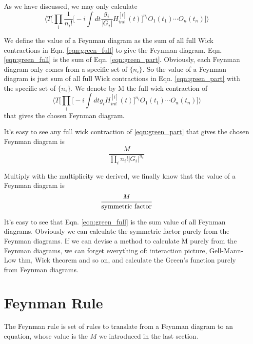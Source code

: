 \documentclass[12pt]{book}
\begin{document}
	As we have discussed, we may only calculate
	\begin{equation}
		\Big \langle T\Big[ \prod_i\frac 1{n_i!}\Big[-i\int dt \frac {g_i}{|G_i|} H_{int}^{[i]}(t)\Big]^{n_i}O_1(t_1)\cdots O_n(t_n)\Big] \Big \rangle \label{eqn:green_part}
	\end{equation} 
	
	We define the value of a Feynman diagram as the sum of all full Wick contractions in Eqn. \ref{eqn:green_full} to give the  Feynman diagram. Eqn. \ref{eqn:green_full} is the sum of Eqn. \ref{eqn:green_part}. Obviously, each Feynman diagram only comes from a specific set of $\{n_i\}$. So the value of a Feynman diagram is just sum of all full Wick contractions in Eqn. \ref{eqn:green_part} with the specific set of $\{n_i\}$. We denote by M the full wick contraction of   
	\begin{equation}
		\Big \langle T\Big[\prod_i\Big[-i\int dt g_iH_{int}^{[i]}(t)\Big]^{n_i}O_1(t_1)\cdots O_n(t_n)\Big] \Big \rangle \label{eqn:green_part}
	\end{equation} 
	that gives the chosen Feynman diagram.
	
	It's easy to see any full wick contraction of \ref{eqn:green_part} that gives the chosen Feynman diagram is
	\begin{equation}
		\frac M{\prod_in_i!|G_i|^{n_i}} 
	\end{equation} 
	
	Multiply with the multiplicity we derived, we finally know that the value of a Feynman diagram is
	\begin{equation}
		\frac M{\rm symmetric\ factor} 
	\end{equation} 
	
	It's easy to see that Eqn. \ref{eqn:green_full} is the sum value of all Feynman diagrams. Obviously we can calculate the symmetric factor purely from the Feynman diagrams. If we can devise a method to calculate M purely from the Feynman diagrams, we can forget everything of: interaction picture, Gell-Mann-Low thm, Wick theorem and so on, and calculate the Green's function purely from Feynman diagrams.
	
	
	\section{Feynman Rule}
	
	The Feynman rule is set of rules to translate from a Feynman diagram to an equation, whose value is the $M$ we introduced in the last section.
	
\end{document}
